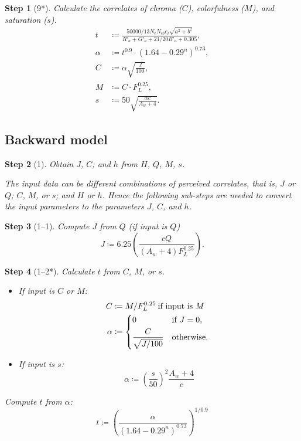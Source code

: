 \documentclass[twocolumn]{scrartcl}
\theoremstyle{named}
\newtheorem*{step}{Step}
\begin{document}
\begin{step}[9*]
Calculate the correlates of chroma ($C$), colorfulness ($M$), and saturation
  ($s$).
\begin{align*}
  t&\coloneqq \frac{50000/13 N_c N_{cb} e_t \sqrt{a^2 + b^2}}{R'_a + G'_a + 21/20 B'_a + 0.305},\\
  \alpha&\coloneqq t^{0.9} \cdot {(1.64 - 0.29^n)}^{0.73},\\
  C&\coloneqq \alpha \sqrt{\frac{J}{100}},\\
  M&\coloneqq C\cdot F_L^{0.25},\\
  s &\coloneqq 50 \sqrt{\frac{\alpha c}{A_w + 4}}.
\end{align*}
\end{step}

\subsection{Backward model}

\begin{step}[1]
  Obtain $J$, $C$; and $h$ from $H$, $Q$, $M$, $s$.

  The input data can be different combinations of perceived correlates, that
  is, $J$ or $Q$; $C$, $M$, or $s$; and $H$ or $h$. Hence the following
  sub-steps are needed to convert the input parameters to the parameters $J$,
  $C$, and $h$.
\end{step}

\begin{step}[1--1]
Compute $J$ from $Q$ (if input is $Q$)
\[
  J\coloneqq 6.25 \left(\frac{cQ}{(A_w+4) F_L^{0.25}}\right).
\]
\end{step}

\begin{step}[1--2*]
Calculate $t$ from $C$, $M$, or $s$.
\begin{itemize}
  \item If input is $C$ or $M$:
    \begin{align*}
      C &\coloneqq M / F_L^{0.25} \:\text{if input is $M$}\\
      \alpha &\coloneqq \begin{dcases*}
          0 &if $J=0$,\\
          \frac{C}{\sqrt{J/100}}& otherwise.
      \end{dcases*}
    \end{align*}
  \item If input is $s$:
    \[
    \alpha \coloneqq {\left(\frac{s}{50}\right)}^2 \frac{A_w+4}{c}
    \]
\end{itemize}
Compute $t$ from $\alpha$:
\[
  t \coloneqq {\left(\frac{\alpha}{{(1.64 - 0.29^n)}^{0.73}}\right)}^{1/0.9}
\]
\end{step}
\end{document}
